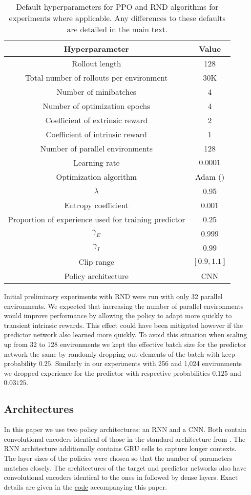 \documentclass{article} \usepackage[dvipsnames]{xcolor}
\begin{document}
\begin{table}[!ht]
\centering
\begin{tabular}{c | c} 
 Hyperparameter & Value  \\ [0.5ex] 
 \hline
 Rollout length & 128  \\
 Total number of rollouts per environment & 30K  \\
 Number of minibatches & 4  \\
 Number of optimization epochs & 4  \\
 Coefficient of extrinsic reward & 2  \\
 Coefficient of intrinsic reward & 1  \\
 Number of parallel environments & 128  \\
 Learning rate & $0.0001$  \\
 Optimization algorithm & Adam (\citet{kingma2014adam})  \\
 $\lambda$ & 0.95 \\
 Entropy coefficient & 0.001 \\
 Proportion of experience used for training predictor & 0.25 \\
 $\gamma_E$ & 0.999 \\
 $\gamma_I$ & 0.99 \\
 Clip range & $[0.9, 1.1]$ \\
 Policy architecture & CNN \\
\end{tabular}
\caption{Default hyperparameters for PPO and RND algorithms for experiments where applicable. Any differences to these defaults are detailed in the main text.}
\label{table:ppo_rnd_hyperparameters}
\end{table}

Initial preliminary experiments with RND were run with only 32 parallel environments. We expected that increasing the number of parallel environments would improve performance by allowing the policy to adapt more quickly to transient intrinsic rewards. This effect could have been mitigated however if the predictor network also learned more quickly. To avoid this situation when scaling up from 32 to 128 environments we kept the effective batch size for the predictor network the same by randomly dropping out elements of the batch with keep probability $0.25$. Similarly in our experiments with 256 and 1,024 environments we dropped experience for the predictor with respective probabilities $0.125$ and $0.03125$.


\subsection{Architectures}
In this paper we use two policy architectures: an RNN and a CNN. Both contain convolutional encoders identical of those in the standard architecture from \citep{dqn}. The RNN architecture additionally contains GRU \citep{cho2014learning} cells to capture longer contexts. The layer sizes of the policies were chosen so that the number of parameters matches closely. The architectures of the target and predictor networks also have convolutional encoders identical to the ones in \citep{dqn} followed by dense layers. Exact details are given in the \href{https://github.com/openai/random-network-distillation}{code} accompanying this paper.
\end{document}

